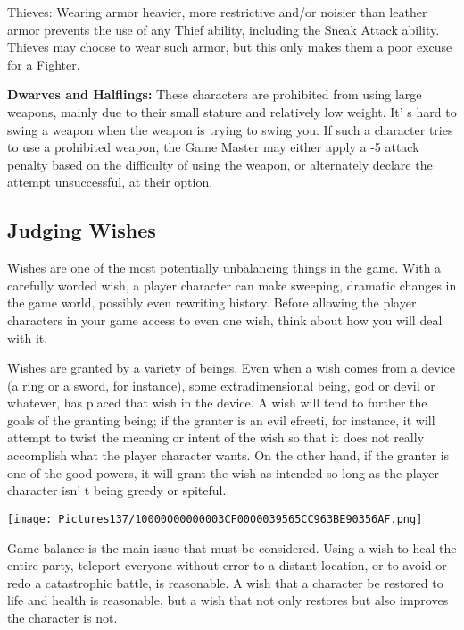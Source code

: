 \documentclass[a4paper,twoside,openany,10pt]{book}
\begin{document}
\begin{multicols}{2}
Thieves: Wearing armor heavier, more restrictive and/or noisier than leather armor prevents the use of any Thief ability, including the Sneak Attack ability. Thieves may choose to wear such armor, but this only makes them a poor excuse for a Fighter.

\textbf{Dwarves and Halflings:} These characters are prohibited from using large weapons, mainly due to their small stature and relatively low weight. It' s hard to swing a weapon when the weapon is trying to swing you. If such a character tries to use a prohibited weapon, the Game Master may either apply a -5 attack penalty based on the difficulty of using the weapon, or alternately declare the attempt unsuccessful, at their option.

\subsection{Judging Wishes}\label{judging-wishes}

Wishes are one of the most potentially unbalancing things in the game.  With a carefully worded wish, a player character can make sweeping, dramatic changes in the game world, possibly even rewriting history. Before allowing the player characters in your game access to even one wish, think about how you will deal with it.

Wishes are granted by a variety of beings. Even when a wish comes from a device (a ring or a sword, for instance), some extradimensional being, god or devil or whatever, has placed that wish in the device. A wish will tend to further the goals of the granting being; if the granter is an evil efreeti, for instance, it will attempt to twist the meaning or intent of the wish so that it does not really accomplish what the player character wants. On the other hand, if the granter is one of the good powers, it will grant the wish as intended so long as the player character isn' t being greedy or spiteful.

\begin{flushleft} \texttt{[image: Pictures137/10000000000003CF0000039565CC963BE90356AF.png]}  \end{flushleft}

Game balance is the main issue that must be considered. Using a wish to heal the entire party, teleport everyone without error to a distant location, or to avoid or redo a catastrophic battle, is reasonable. A wish that a character be restored to life and health is reasonable, but a wish that not only restores but also improves the character is not.


\end{multicols}
\end{document}

